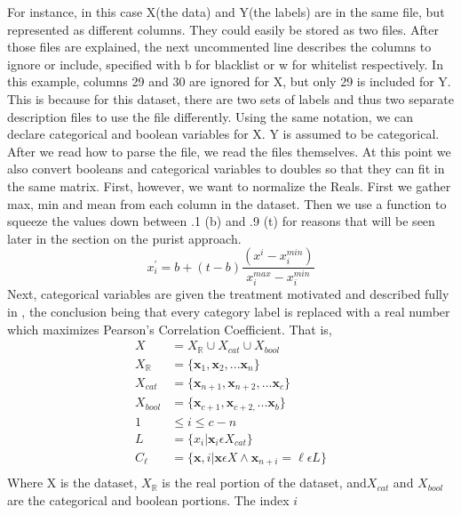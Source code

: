 For instance, in this case X(the data) and Y(the labels) are in the same file,
but represented as different columns.  They could easily be stored as two files.
After those files are explained, the next uncommented line describes the
columns to ignore or include, specified with b for blacklist or w for whitelist
respectively.  In this example, columns 29 and 30 are ignored for X, but only 29
is included for Y.  This is because for this dataset, there are two sets of
labels and thus two separate description files to use the file differently. 
Using the same notation, we can declare categorical and boolean variables for X.
Y is assumed to be categorical.\\
After we read how to parse the file, we read the files themselves.  At this
point we also convert booleans and categorical variables to doubles so that they
can fit in the same matrix.  First, however, we want to normalize the Reals. 
First we gather max, min and mean from each column in the dataset.  Then we use
a function to squeeze the values down between .1 (b) and .9 (t) for reasons that
will be seen later in the section on the purist approach.  
$$x_i^{\prime} = b+(t-b)\frac{(x^i-x_i^{min})}{x_i^{max}-x_i^{min}}$$ Next,
categorical variables are given the treatment motivated and described fully in
\cite{zhang_visual_2015}, the conclusion being that every category label is
replaced with a real number which maximizes Pearson's Correlation Coefficient. 
That is,
\begin{align*}
	X &= {X_\mathbb{R} \cup X_{cat} \cup X_{bool}}\\
X_\mathbb{R} &= \{\textbf{x}_1, \textbf{x}_2, ... \textbf{x}_n\}\\
X_{cat} &= \{\textbf{x}_{n+1}, \textbf{x}_{n+2}, ... \textbf{x}_c\}\\%
X_{bool} &= \{\textbf{x}_{c+1}, \textbf{x}_{c+2,} ... \textbf{x}_b\} \\
1&\leq i \leq c-n\\
L &= \{x_i|\textbf{x}_i\epsilon X_{cat}\}\\%
C_\ell &= \{\textbf{x}, i|  \textbf{x}\epsilon X \wedge \textbf{x}_{n+i} = \ell\epsilon L \}\\%
\end{align*}
Where X is the dataset, $X_\mathbb{R}$ is the real portion of the dataset, and$
X_{cat}$ and $X_{bool}$ are the categorical and boolean portions.  The index $i$
